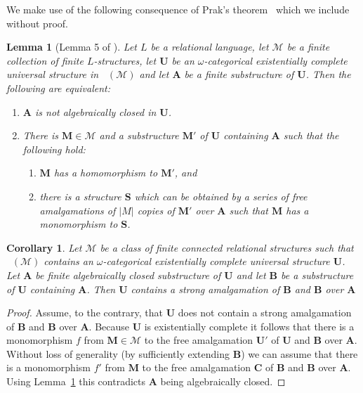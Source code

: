 \documentclass{elsarticle}
\def\Forbm{\mathop{\mathrm{Forb_m}}\nolimits}
\def\str#1{\mathbf {#1}}
\theoremstyle{plain}
\newtheorem{corollary}[theorem]{Corollary}
\newtheorem{lemma}[theorem]{Lemma}
\theoremstyle{definition}
\theoremstyle{remark}
\begin{document}
We make use of the following consequence of Prak's theorem~\cite{Prak,Cherlin1999} which we include without proof.
\begin{lemma}[Lemma 5 of \cite{Cherlin1999}]
\label{lem:lemma5}
Let $L$ be a relational language,
let $\mathcal M$ be a finite collection of finite $L$-structures, let $\str{U}$ be
an $\omega$-categorical existentially complete universal structure in $\Forbm(\mathcal M)$ and
let $\str{A}$ be a finite substructure of $\str{U}$. Then the following are equivalent:
\begin{enumerate}
\item $\str{A}$ is not algebraically closed in $\str{U}$.
\item There is $\str{M}\in \mathcal M$ and a substructure $\str{M}'$ of $\str{U}$ containing $\str{A}$ such that the following hold:
\begin{enumerate}
\item $\str M$ has a homomorphism to $\str M'$, and
\item there is a structure $\str S$ which can be obtained by a series of free amalgamations of $\vert M\vert$ copies of $\str M'$ over $\str A$ such that $\str M$ has a monomorphism to $\str S$.
\end{enumerate}
\end{enumerate}
\end{lemma}
\begin{corollary}
\label{cor:algc2}
Let $\mathcal M$ be a class of finite connected relational structures such that $\Forbm(\mathcal M)$
contains an $\omega$-categorical existentially complete universal structure $\str{U}$.
Let $\str{A}$ be finite algebraically closed substructure of $\str{U}$ and let $\str{B}$ be a substructure of $\str{U}$ containing $\str{A}$.
Then $\str{U}$ contains a strong amalgamation of $\str{B}$ and $\str{B}$ over $\str{A}$
\end{corollary}
\begin{proof}
Assume, to the contrary, that $\str{U}$ does not contain a strong amalgamation of $\str{B}$ and $\str{B}$ over $\str{A}$.
Because $\str{U}$ is existentially complete it follows that there is a monomorphism $f$ from $\str{M}\in \mathcal M$
to the free amalgamation $\str{U}'$ of $\str{U}$ and $\str{B}$ over $\str{A}$. Without loss of generality (by sufficiently extending $\str{B}$) we can assume
that there is a monomorphism $f'$ from $\str{M}$ to the free amalgamation $\str{C}$ of $\str{B}$ and $\str{B}$ over $\str{A}$.
Using Lemma~\ref{lem:lemma5} this contradicts $\str{A}$ being algebraically closed.
\end{proof}
\end{document}
